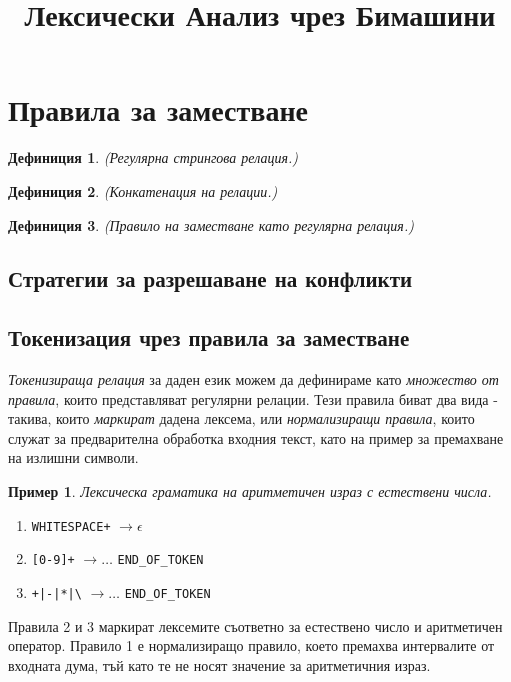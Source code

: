 \documentclass[11pt, oneside]{article}
\title{Лексически Анализ чрез Бимашини}
\theoremstyle{definition}
\newtheorem{definition}{Дефиниция}[section]
\newtheorem{example}{Пример}[subsection]
\begin{document}
\tableofcontents

\section{Правила за заместване}

\begin{definition}{\emph{(Регулярна стрингова релация.)}}
	
\end{definition}

\begin{definition}{\emph{(Конкатенация на релации.)}}
	
\end{definition}

\begin{definition}{\emph{(Правило на заместване като регулярна релация.)}}
	
\end{definition}

\subsection{Стратегии за разрешаване на конфликти}

\subsection{Токенизация чрез правила за заместване}

\emph{Токенизираща релация} за даден език можем да дефинираме като \emph{множество от правила}, които представляват регулярни релации. Тези правила биват два вида - такива, които \emph{маркират} дадена лексема, или \emph{нормализиращи правила}, които служат за предварителна обработка входния текст, като на пример за премахване на излишни символи.

\begin{example}{\emph{Лексическа граматика на аритметичен израз с естествени числа.}}
	\begin{enumerate}
		\item \verb/WHITESPACE+/ \( \to \epsilon \)
		\item \verb/[0-9]+/ \( \to \dots \) \verb/END_OF_TOKEN/
		\item \verb/+|-|*|\/ \( \to \dots \) \verb/END_OF_TOKEN/
	\end{enumerate}
\end{example}

Правила 2 и 3 маркират лексемите съответно за естествено число и аритметичен оператор. Правило 1 е нормализиращо правило, което премахва интервалите от входната дума, тъй като те не носят значение за аритметичния израз.
\end{document}
